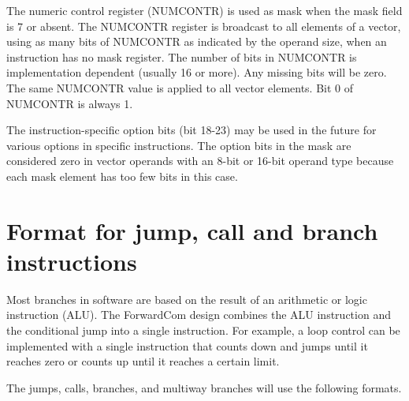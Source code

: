 \documentclass[forwardcom.tex]{subfiles}
\begin{document}
The numeric control register (NUMCONTR) is used as mask when the mask field is 7 or absent. The NUMCONTR register is broadcast to all elements of a vector, using as many bits of NUMCONTR as indicated by the operand size, when an instruction has no mask register. The number of bits in NUMCONTR is implementation dependent (usually 16 or more). Any missing bits will be zero. 
The same NUMCONTR value is applied to all vector elements. 
Bit 0 of NUMCONTR is always 1.
\vv

The instruction-specific option bits (bit 18-23) may be used in the future for various options in specific instructions. The option bits in the mask are considered zero in vector operands with an 8-bit or 16-bit operand type because each mask element has too few bits in this case. 
\vv

\section{Format for jump, call and branch instructions}
Most branches in software are based on the result of an arithmetic or logic instruction (ALU). The ForwardCom design combines the ALU instruction and the conditional jump into a single instruction. For example, a loop control can be implemented with a single instruction that counts down and jumps until it reaches zero or counts up until it reaches a certain limit.
\vv

The jumps, calls, branches, and multiway branches will use the following formats.
\end{document}

